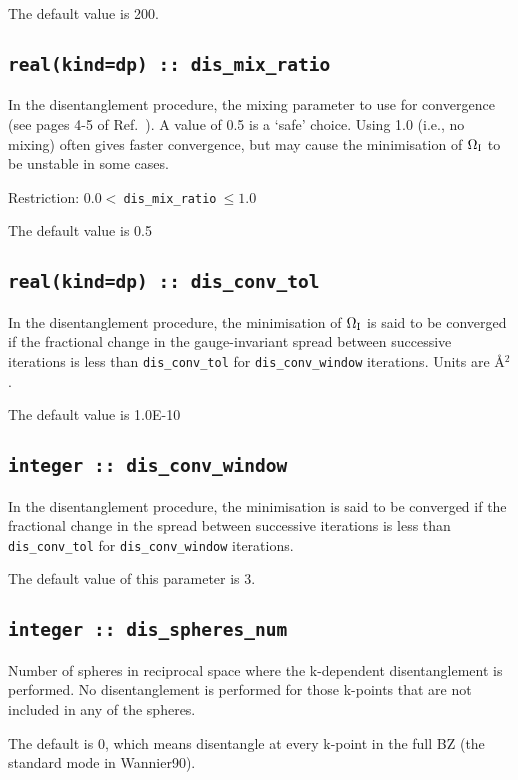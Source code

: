 The default value is 200.

\subsection[dis\_mix\_ratio]{\tt real(kind=dp) :: dis\_mix\_ratio}
In the disentanglement procedure, the mixing parameter to use for
convergence (see pages 4-5 of Ref.~\cite{souza-prb01}). A value of 0.5
is a `safe' choice. Using 1.0 (i.e., no mixing) often gives faster
convergence, but may cause the minimisation of $\Omega_{\mathrm{I}}$ to be unstable
in some cases.

Restriction: $0.0<\:${\tt dis\_mix\_ratio}$\:\leq 1.0$

The default value is 0.5

\subsection[dis\_conv\_tol]{\tt real(kind=dp) :: dis\_conv\_tol}

In the disentanglement procedure, the minimisation of $\Omega_{\mathrm{I}}$ is said
to be converged if the fractional change in the gauge-invariant spread
between successive iterations is less than
\verb#dis_conv_tol# for \verb#dis_conv_window# iterations. Units are \AA$^2$.

The default value is 1.0E-10


\subsection[dis\_conv\_window]{\tt integer :: dis\_conv\_window}

In the disentanglement procedure, the minimisation is said to be converged
if the fractional change in the spread between successive
iterations is less than
\verb#dis_conv_tol# for \verb#dis_conv_window# iterations.

The default value of this parameter is 3.

\subsection[dis\_spheres\_num]{\tt integer :: dis\_spheres\_num}
Number of spheres in reciprocal space where the k-dependent
disentanglement is performed. No disentanglement is performed for
those k-points that are not included in any of the spheres.

The default is 0, which means disentangle at every k-point in the full BZ (the standard mode in Wannier90).


